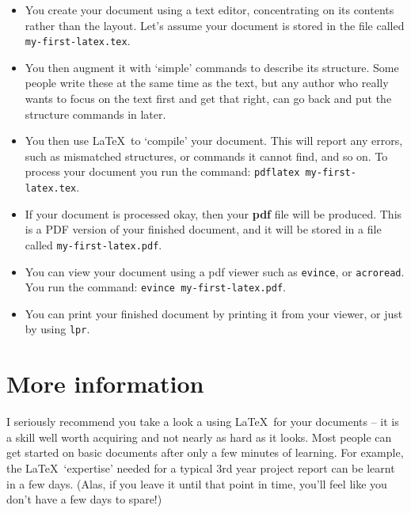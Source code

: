\documentclass[12pt,a4paper]{article}
\begin{document}
\begin{itemize}


\item You create your document using a text editor, concentrating on
  its contents rather than the layout. Let's assume your document is
  stored in the file called \texttt{my-first-latex.tex}.

\item You then augment it with `simple' commands to describe its structure.
Some people write these at the same time as the text, but any author who
really wants to focus on the text first and get that right, can go back and
put the structure commands in later.

\item You then use \LaTeX\ to `compile' your document. This will report any
errors, such as mismatched structures, or commands it cannot find, and so on.
To process your document you run the command: \texttt{pdflatex
my-first-latex.tex}.

\item If your document is processed okay, then your \textbf{pdf} file will be
produced. This is a PDF version of your finished document, and
it will be stored in a file called \texttt{my-first-latex.pdf}.

\item You can view your document using a pdf viewer such as \texttt{evince}, or \texttt{acroread}. You
run the command: \texttt{evince my-first-latex.pdf}.

\item You can print your finished document by printing it from your viewer, or just by using \texttt{lpr}.

\end{itemize}


\section{More information}

I seriously recommend you take a look a using \LaTeX\ for your documents -- it
is a skill well worth acquiring and not nearly as hard as it looks. Most
people can get started on basic documents after only a few minutes of
learning. For example, the \LaTeX\ `expertise' needed for a typical 3rd year
project report can be learnt in a few days. (Alas, if you leave it until that
point in time, you'll feel like you don't have a few days to spare!)
\end{document}
